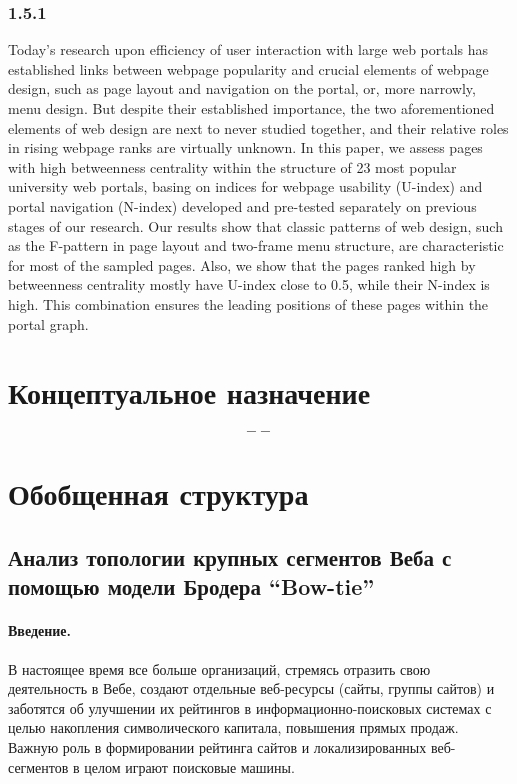 \subsubsection{1.5.1}

Today's research upon efficiency of user interaction with large web portals has established links between webpage popularity and crucial elements of webpage design, such as page layout and navigation on the portal, or, more narrowly, menu design. But despite their established importance, the two aforementioned elements of web design are next to never studied together, and their relative roles in rising webpage ranks are virtually unknown. In this paper, we assess pages with high betweenness centrality within the structure of 23 most popular university web portals, basing on indices for webpage usability (U-index) and portal navigation (N-index) developed and pre-tested separately on previous stages of our research. Our results show that classic patterns of web design, such as the F-pattern in page layout and two-frame menu structure, are characteristic for most of the sampled pages. Also, we show that the pages ranked high by betweenness centrality mostly have U-index close to 0.5, while their N-index is high. This combination ensures the leading positions of these pages within the portal graph.

\section{Концептуальное назначение}\label{sec:ch1/sec1}

\[
--
\]

\section{Обобщенная структура}\label{sec:ch1/sec2}

\subsection{Анализ топологии крупных сегментов Веба с помощью модели Бродера “Bow-tie”}\label{subsec:ch1/sec2/sub1}

\paragraph{Введение.} В настоящее время все больше организаций, стремясь отразить свою деятельность в Вебе, создают отдельные веб-ресурсы (сайты, группы сайтов) и заботятся об улучшении их рейтингов в информационно-поисковых системах с целью накопления символического капитала, повышения прямых продаж. Важную роль в формировании рейтинга сайтов и локализированных веб-сегментов в целом играют поисковые машины.

